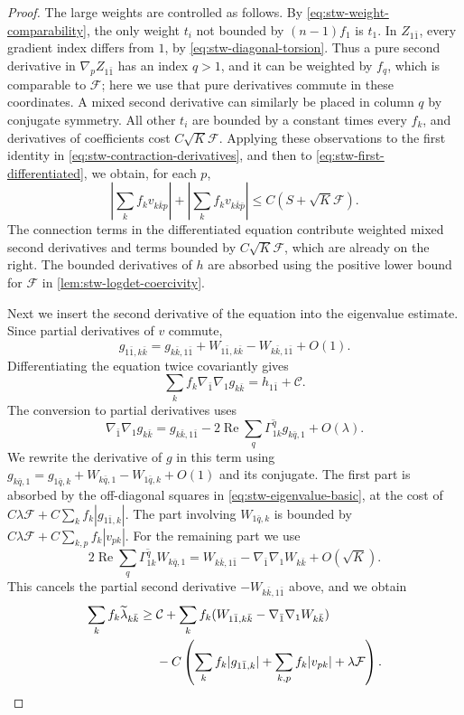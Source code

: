 \begin{proof}
The large weights are controlled as follows. By \eqref{eq:stw-weight-comparability}, the only weight $t_i$ not bounded by $(n-1)f_1$ is $t_1$. In $Z_{1\bar1}$, every gradient index differs from $1$, by \eqref{eq:stw-diagonal-torsion}. Thus a pure second derivative in $\nabla_pZ_{1\bar1}$ has an index $q>1$, and it can be weighted by $f_q$, which is comparable to $\mathcal F$; here we use that pure derivatives commute in these coordinates. A mixed second derivative can similarly be placed in column $q$ by conjugate symmetry. All other $t_i$ are bounded by a constant times every $f_k$, and derivatives of coefficients cost $C\sqrt K\mathcal F$. Applying these observations to the first identity in \eqref{eq:stw-contraction-derivatives}, and then to \eqref{eq:stw-first-differentiated}, we obtain, for each $p$,
\begin{equation}\label{eq:stw-weighted-third-bound}
 \left|\sum_k f_kv_{k\bar k p}\right|
       +\left|\sum_k f_kv_{k\bar k\bar p}\right|
       \leq C(S+\sqrt K\mathcal F).
\end{equation}
The connection terms in the differentiated equation contribute weighted mixed second derivatives and terms bounded by $C\sqrt K\mathcal F$, which are already on the right. The bounded derivatives of $h$ are absorbed using the positive lower bound for $\mathcal F$ in \cref{lem:stw-logdet-coercivity}.

Next we insert the second derivative of the equation into the eigenvalue estimate. Since partial derivatives of $v$ commute,
\[
 g_{1\bar1,k\bar k}
   =g_{k\bar k,1\bar1}+W_{1\bar1,k\bar k}
          -W_{k\bar k,1\bar1}+O(1).
\]
Differentiating the equation twice covariantly gives
\[
 \sum_k f_k\nabla_{\bar1}\nabla_1g_{k\bar k}
       =h_{1\bar1}+\mathcal C.
\]
The conversion to partial derivatives uses
\[
 \nabla_{\bar1}\nabla_1g_{k\bar k}
       =g_{k\bar k,1\bar1}
           -2\operatorname{Re}\sum_q\overline{\Gamma^q_{1k}}g_{k\bar q,1}
           +O(\lambda).
\]
We rewrite the derivative of $g$ in this term using
$g_{k\bar q,1}=g_{1\bar q,k}+W_{k\bar q,1}-W_{1\bar q,k}+O(1)$ and its conjugate. The first part is absorbed by the off-diagonal squares in \eqref{eq:stw-eigenvalue-basic}, at the cost of $C\lambda\mathcal F+C\sum_k f_k|g_{1\bar1,k}|$. The part involving $W_{1\bar q,k}$ is bounded by
$C\lambda\mathcal F+C\sum_{k,p}f_k|v_{pk}|$. For the remaining part we use
\[
 2\operatorname{Re}\sum_q\overline{\Gamma^q_{1k}}W_{k\bar q,1}
       =W_{k\bar k,1\bar1}
          -\nabla_{\bar1}\nabla_1W_{k\bar k}+O(\sqrt K).
\]
This cancels the partial second derivative $-W_{k\bar k,1\bar1}$ above, and we obtain
\begin{align}
 \sum_k f_k\widetilde\lambda_{k\bar k}
 \geq{}&\mathcal C+\sum_k f_k
       (W_{1\bar1,k\bar k}-\nabla_{\bar1}\nabla_1W_{k\bar k})\notag\\
 &-C\left(\sum_k f_k|g_{1\bar1,k}|
                +\sum_{k,p}f_k|v_{pk}|+\lambda\mathcal F\right).
 \label{eq:stw-eigenvalue-torsion-remainder}
\end{align}


\end{proof}
